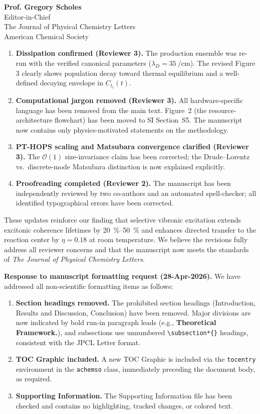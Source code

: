 \documentclass[11pt,a4paper]{letter}
\begin{document}
\begin{letter}{
\textbf{Prof. Gregory Scholes}\\
Editor-in-Chief\\
The Journal of Physical Chemistry Letters\\
American Chemical Society
}
\begin{enumerate}
\item \textbf{Dissipation confirmed (Reviewer 3).} The production ensemble was re-run with the verified canonical parameters ($\lambda_D = \SI{35}{\per\centi\meter}$). The revised Figure 3 clearly shows population decay toward thermal equilibrium and a well-defined decaying envelope in $C_{l_1}(t)$.

\item \textbf{Computational jargon removed (Reviewer 3).} All hardware-specific language has been removed from the main text. Figure~2 (the resource-architecture flowchart) has been moved to SI Section~S5. The manuscript now contains only physics-motivated statements on the methodology.

\item \textbf{PT-HOPS scaling and Matsubara convergence clarified (Reviewer 3).} The $\mathcal{O}(1)$ size-invariance claim has been corrected; the Drude--Lorentz vs.\ discrete-mode Matsubara distinction is now explained explicitly.

\item \textbf{Proofreading completed (Reviewer 2).} The manuscript has been independently reviewed by two co-authors and an automated spell-checker; all identified typographical errors have been corrected.
\end{enumerate}

These updates reinforce our finding that selective vibronic excitation extends excitonic coherence lifetimes by \SIrange{20}{50}{\percent} and enhances directed transfer to the reaction center by $\eta = 0.18$ at room temperature. We believe the revisions fully address all reviewer concerns and that the manuscript now meets the standards of \textit{The Journal of Physical Chemistry Letters}.

\textbf{Response to manuscript formatting request (28-Apr-2026).}
We have addressed all non-scientific formatting items as follows:
\begin{enumerate}
\item \textbf{Section headings removed.} The prohibited section headings (Introduction, Results and Discussion, Conclusion) have been removed. Major divisions are now indicated by bold run-in paragraph leads (e.g., \textbf{Theoretical Framework.}), and subsections use unnumbered \texttt{\textbackslash subsection*\{\}} headings, consistent with the JPCL Letter format.
\item \textbf{TOC Graphic included.} A new TOC Graphic is included via the \texttt{tocentry} environment in the \texttt{achemso} class, immediately preceding the document body, as required.
\item \textbf{Supporting Information.} The Supporting Information file has been checked and contains no highlighting, tracked changes, or colored text.
\end{enumerate}


\end{letter}
\end{document}
